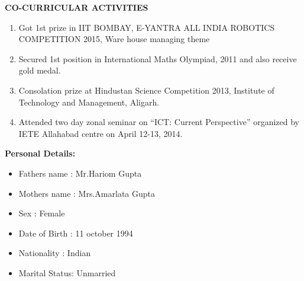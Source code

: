 \documentclass[10pt]{article}
\begin{document}
		\textbf{CO-CURRICULAR ACTIVITIES}\\
		\begin{enumerate}
	\item 	Got 1st prize in IIT BOMBAY, E-YANTRA ALL INDIA ROBOTICS COMPETITION 2015,
	Ware house managing theme 
	\item 	Secured 1st position in International Maths Olympiad, 2011 and also receive gold medal.
	\item 	Consolation prize at Hindustan Science Competition 2013, Institute of Technology and Management, Aligarh.
	\item 	Attended two day zonal seminar on “ICT: Current Perspective” organized by IETE Allahabad centre on April 12-13, 2014.
	
		\end{enumerate}
		\textbf{Personal Details:}\\
		\begin{itemize}
			\item Fathers name : Mr.Hariom Gupta
			\item Mothers name : Mrs.Amarlata Gupta
			\item Sex          : Female
			\item Date of Birth : 11 october 1994
			\item Nationality : Indian
			\item Marital Status: Unmarried
	    \end{itemize}
	
\end{document}
